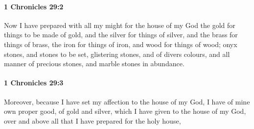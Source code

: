 		\paragraph{1 Chronicles 29:2} %
			\label{1CHRONICLES-29-2}

			Now I have prepared with all my might for the house of my God the gold for things to be made of gold, and the silver for things of silver, and the brass for things of brass, the iron for things of iron, and wood for things of wood; onyx stones, and stones to be set, glistering stones, and of divers colours, and all manner of precious stones, and marble stones in abundance.


		\paragraph{1 Chronicles 29:3} %
			\label{1CHRONICLES-29-3}

			Moreover, because I have set my affection to the house of my God, I have of mine own proper good, of gold and silver, which I have given to the house of my God, over and above all that I have prepared for the holy house,


